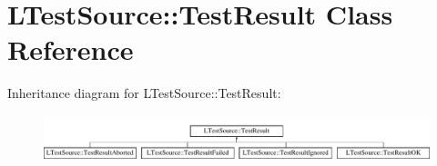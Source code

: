 \hypertarget{class_l_test_source_1_1_test_result}{\section{L\-Test\-Source\-:\-:Test\-Result Class Reference}
\label{class_l_test_source_1_1_test_result}
}
Inheritance diagram for L\-Test\-Source\-:\-:Test\-Result\-:\begin{figure}[H]
\begin{center}
\leavevmode
\includegraphics[height=1.407035cm]{class_l_test_source_1_1_test_result}
\end{center}
\end{figure}
